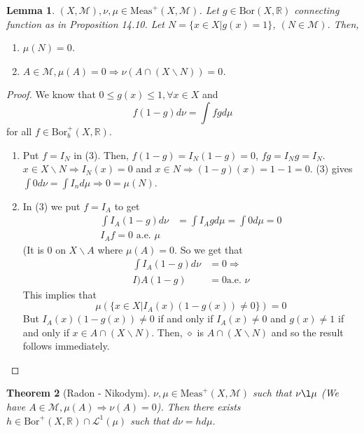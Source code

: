 \documentclass[letterpaper, 12pt]{article}
\newcommand{\cL}{\mathcal{L}}
\newcommand{\cM}{\mathcal{M}}
\newcommand{\bR}{\mathbb{R}}
\newcommand{\Meas}{\mathrm{Meas}}
\newcommand{\Bor}{\mathrm{Bor}}
\theoremstyle{stdthm}
\newtheorem{thm}{Theorem}[section]
\newtheorem{lem}[thm]{Lemma}
\theoremstyle{stddef}
\theoremstyle{stdnonum}
\theoremstyle{stdqands}
\theoremstyle{stdbold}
\begin{document}
\begin{lem}
$(X,\cM), \nu, \mu \in \Meas^+(X,\cM)$. Let $g \in \Bor(X,\bR)$ connecting function as in Proposition 14.10. Let $N = \{ x \in X| g(x) = 1\}$, $(N \in \cM)$. Then, 
\begin{enumerate}
\item $\mu(N) = 0$.
\item $A \in \cM, \mu(A) = 0 \Rightarrow \nu(A \cap (X \backslash N)) = 0$. 
\end{enumerate}
\end{lem}
\begin{proof}
We know that $0 \leq g(x) \leq 1, \forall x \in X$ and
\[ \tag{(3)} f(1-g) d\nu = \int fg d\mu \] for all $f \in \Bor_b^+(X,\bR)$.

\begin{enumerate}
\item Put $f = I_N$ in (3). Then, $f(1-g) = I_N(1-g) = 0$, $fg = I_N g = I_N$. $x \in X \backslash N \Rightarrow I_N(x) = 0$ and $x \in N \Rightarrow (1-g)(x) = 1-1 = 0$. (3) gives $\int 0 d\nu  = \int I_n d\mu \Rightarrow 0 = \mu(N)$. 
\item In (3) we put $f = I_A$ to get 
\begin{align*}
\int I_A (1-g) d\nu &= \int I_A g d\mu = \int 0 d\mu = 0 \\
I_A f = 0 \mbox{ a.e. } \mu
\end{align*}
(It is $0$ on $X \backslash A$ where $\mu(A) = 0$. So we get that 
\begin{align*}
\int I_A(1-g) d\nu &= 0\Rightarrow \\
I)A(1-g) &= 0 \mbox{a.e. } \nu
\end{align*}
This implies that 
\[\tag{$\diamond$} \mu \left( \{x \in X| I_A(x) (1-g(x)) \neq 0 \} \right) = 0 \]
But $I_A(x) (1-g(x)) \neq 0$ if and only if $I_A(x) \neq 0$ and $g(x) \neq 1$ if and only if $x \in A \cap (X \backslash N)$. Then, $\diamond$ is $A \cap (X\backslash N)$ and so the result follows immediately. 
\end{enumerate}

\end{proof}

\begin{thm} [Radon - Nikodym]
$\nu, \mu \in \Meas^+(X,\cM)$ such that $\nu \l \mu$ (We have $A \in \cM, \mu(A) \Rightarrow \nu(A) = 0$). Then there exists $h \in \Bor^+(X,\bR) \cap \cL^1(\mu)$ such that $d\nu = h d\mu$. 
\end{thm}
\end{document}
